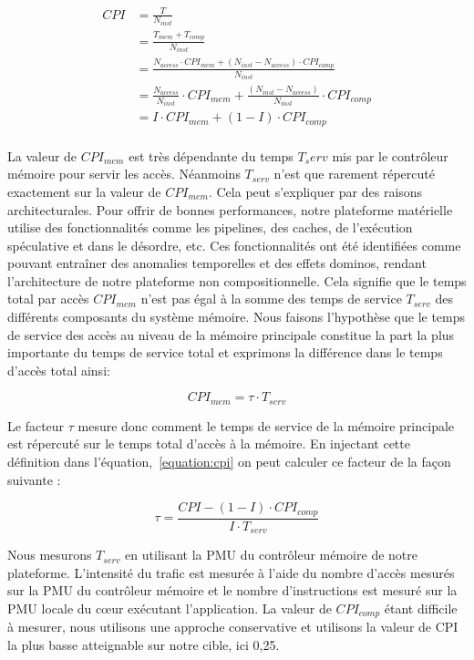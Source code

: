 \begin{equation}
	\label{equation:cpi}
	\begin{split}
	CPI & = \frac{T}{N_{inst}} \\
		& = \frac{T_{mem} + T_{comp}}{N_{inst}} \\
		& = \frac{N_{access} \cdot CPI_{mem}+ (N_{inst}-N_{access}) \cdot CPI_{comp}}{N_{inst}} \\
		& = \frac{N_{access}}{N_{inst}} \cdot CPI_{mem} +  \frac{(N_{inst}-N_{access})}{N_{inst}} \cdot CPI_{comp} \\
		& = I \cdot CPI_{mem} + (1-I) \cdot CPI_{comp} \\
	\end{split}
\end{equation}

La valeur de $CPI_{mem}$ est très dépendante du temps $T_serv$ mis par le contrôleur mémoire pour servir les accès.
Néanmoins $T_{serv}$ n'est que rarement répercuté exactement sur la valeur de $CPI_{mem}$.
Cela peut s'expliquer par des raisons architecturales.
Pour offrir de bonnes performances, notre plateforme matérielle utilise des fonctionnalités comme les pipelines, des caches, de l'exécution spéculative et dans le désordre, etc.
Ces fonctionnalités ont été identifiées comme pouvant entraîner des anomalies temporelles et des effets dominos, rendant l'architecture de notre plateforme non compositionnelle.
Cela signifie que le temps total par accès $CPI_{mem}$ n'est pas égal à la somme des temps de service $T_{serv}$ des différents composants du système mémoire.
Nous faisons l'hypothèse que le temps de service des accès au niveau de la mémoire principale constitue la part la plus importante du temps de service total et exprimons la différence dans le temps d'accès total ainsi:

\begin{equation}
	\label{equation:cpi_mem}
	CPI_{mem} = \tau \cdot T_{serv}
\end{equation}

Le facteur $\tau$ mesure donc comment le temps de service de la mémoire principale est répercuté sur le temps total d'accès à la mémoire.
En injectant cette définition dans l'équation,~\ref{equation:cpi} on peut calculer ce facteur de la façon suivante :

\begin{equation}
	\label{equation:tau}
	\tau = \frac{CPI - (1-I) \cdot CPI_{comp}}{I \cdot T_{serv}}
\end{equation}

Nous mesurons $T_{serv}$ en utilisant la PMU du contrôleur mémoire de notre plateforme.
L'intensité du trafic est mesurée à l'aide du nombre d'accès mesurés sur la PMU du contrôleur mémoire et le nombre d'instructions est mesuré sur la PMU locale du cœur exécutant l'application.
La valeur de $CPI_{comp}$ étant difficile à mesurer, nous utilisons une approche conservative et utilisons la valeur de CPI la plus basse atteignable sur notre cible, ici 0,25.


